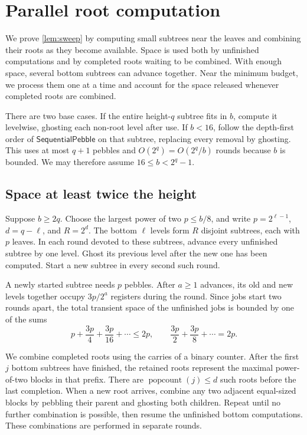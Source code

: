 \documentclass[11pt]{article}
\theoremstyle{definition}
\theoremstyle{remark}
\DeclareMathOperator{\popcount}{popcount}
\newcommand{\Fast}{\mathsf{SequentialPebble}}
\begin{document}
\section{Parallel root computation}
\label{app:sweep}

We prove \cref{lem:sweep} by computing small subtrees near the leaves and combining their roots as they become available. Space is used both by unfinished computations and by completed roots waiting to be combined. With enough space, several bottom subtrees can advance together. Near the minimum budget, we process them one at a time and account for the space released whenever completed roots are combined.

There are two base cases. If the entire height-$q$ subtree fits in $b$, compute it levelwise, ghosting each non-root level after use. If $b<16$, follow the depth-first order of $\Fast$ on that subtree, replacing every removal by ghosting. This uses at most $q+1$ pebbles and $O(2^q)=O(2^q/b)$ rounds because $b$ is bounded. We may therefore assume $16\le b<2^q-1$.

\subsection{Space at least twice the height}

Suppose $b\ge2q$. Choose the largest power of two $p\le b/8$, and write $p=2^{\ell-1}$, $d=q-\ell$, and $R=2^d$. The bottom $\ell$ levels form $R$ disjoint subtrees, each with $p$ leaves. In each round devoted to these subtrees, advance every unfinished subtree by one level. Ghost its previous level after the new one has been computed. Start a new subtree in every second such round.

A newly started subtree needs $p$ pebbles. After $a\ge1$ advances, its old and new levels together occupy $3p/2^a$ registers during the round. Since jobs start two rounds apart, the total transient space of the unfinished jobs is bounded by one of the sums
\[
p+\frac{3p}{4}+\frac{3p}{16}+\cdots\le2p, \qquad \frac{3p}{2}+\frac{3p}{8}+\cdots=2p.
\]

We combine completed roots using the carries of a binary counter. After the first $j$ bottom subtrees have finished, the retained roots represent the maximal power-of-two blocks in that prefix. There are $\popcount(j)\le d$ such roots before the last completion. When a new root arrives, combine any two adjacent equal-sized blocks by pebbling their parent and ghosting both children. Repeat until no further combination is possible, then resume the unfinished bottom computations. These combinations are performed in separate rounds.
\end{document}
